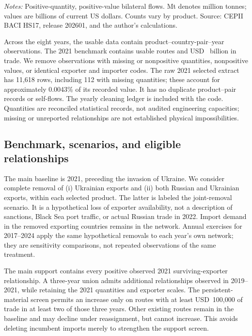 \documentclass[11pt,a4paper]{article}
\begin{document}
\begin{table}[htbp]\centering\small
\caption{The 2021 product networks}\label{tab:coverage}

\begin{minipage}{\textwidth}\footnotesize\textit{Notes:} Positive-quantity, positive-value bilateral flows. Mt denotes million tonnes; values are billions of current US dollars. Counts vary by product. Source: CEPII BACI HS17, release 202601, and the author's calculations.\end{minipage}
\end{table}

Across the eight years, the usable data contain \TotalRoutes{} product--country-pair--year observations. The 2021 benchmark contains \BaseRoutes{} usable routes and USD~\BaseValue{} billion in trade. We remove observations with missing or nonpositive quantities, nonpositive values, or identical exporter and importer codes. The raw 2021 selected extract has 11,618 rows, including 112 with missing quantities; these account for approximately 0.0043\% of its recorded value. It has no duplicate product--pair records or self-flows. The yearly cleaning ledger is included with the code. Quantities are reconciled statistical records, not audited engineering capacities; missing or unreported relationships are not established physical impossibilities.

\subsection{Benchmark, scenarios, and eligible relationships}
The main baseline is 2021, preceding the invasion of Ukraine. We consider complete removal of (i) Ukrainian exports and (ii) both Russian and Ukrainian exports, within each selected product. The latter is labeled the joint-removal scenario. It is a hypothetical loss of exporter availability, not a description of sanctions, Black Sea port traffic, or actual Russian trade in 2022. Import demand in the removed exporting countries remains in the network. Annual exercises for 2017--2024 apply the same hypothetical removals to each year's own network; they are sensitivity comparisons, not repeated observations of the same treatment.

The main support contains every positive observed 2021 surviving-exporter relationship. A three-year union admits additional relationships observed in 2019--2021, while retaining the 2021 quantities and exporter scales. The persistent-material screen permits an increase only on routes with at least USD~100,000 of trade in at least two of those three years. Other existing routes remain in the baseline and may decline under reassignment, but cannot increase. This avoids deleting incumbent imports merely to strengthen the support screen.
\end{document}

